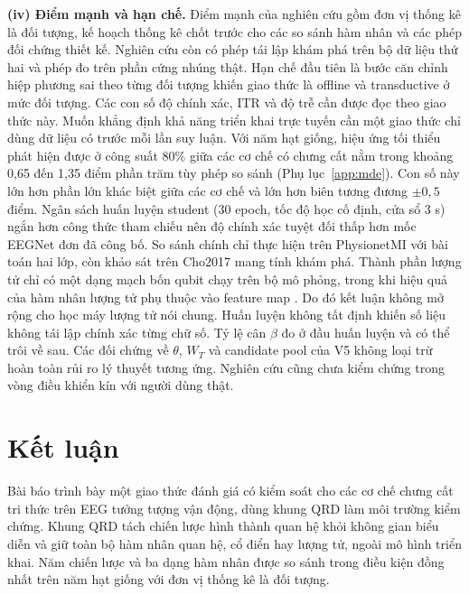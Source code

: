 \textbf{(iv) Điểm mạnh và hạn chế.} Điểm mạnh của nghiên cứu gồm đơn vị thống kê là đối tượng, kế hoạch thống kê
chốt trước cho các so sánh hàm nhân và các phép đối chứng thiết kế. Nghiên cứu
còn có phép tái lập khám phá trên bộ dữ liệu thứ hai và phép đo trên phần cứng
nhúng thật. Hạn chế đầu tiên là bước căn chỉnh
hiệp phương sai theo từng đối tượng khiến giao thức là offline và
transductive ở mức đối tượng. Các con số độ chính xác, ITR và độ trễ cần
được đọc theo giao thức này. Muốn khẳng định khả năng triển khai trực tuyến
cần một giao thức chỉ dùng dữ liệu có trước mỗi lần suy luận. Với năm hạt giống, hiệu ứng tối thiểu phát hiện được ở công suất 80\% giữa
các cơ chế có chưng cất nằm trong khoảng 0,65 đến 1,35 điểm phần trăm tùy
phép so sánh
(Phụ lục~\ref{app:mde}). Con số này lớn hơn phần lớn khác biệt giữa các cơ
chế và lớn hơn biên tương đương $\pm 0{,}5$ điểm. Ngân sách huấn luyện
student (30 epoch, tốc độ học cố định, cửa sổ 3 s) ngắn hơn công thức tham
chiếu nên độ chính xác tuyệt đối thấp hơn mốc EEGNet đơn đã công bố. So sánh chính chỉ thực hiện
trên PhysionetMI với bài toán hai lớp, còn khảo sát trên Cho2017 mang tính
khám phá. Thành phần lượng tử chỉ có một dạng mạch bốn qubit chạy trên bộ
mô phỏng, trong khi hiệu quả của hàm nhân lượng tử phụ thuộc vào feature map
\cite{jha2026comparative}. Do đó kết luận không mở rộng cho học máy lượng tử
nói chung. Huấn
luyện không tất định khiến số liệu không tái lập chính xác từng chữ số. Tỷ
lệ cân $\beta$ đo ở đầu huấn luyện và có thể trôi về sau. Các đối chứng về
$\theta$, $W_T$ và candidate pool của V5 không loại trừ hoàn toàn rủi ro lý
thuyết tương ứng. Nghiên cứu cũng chưa kiểm chứng trong vòng điều khiển kín
với người dùng thật.

\section{Kết luận}
\label{sec:ketluan}

Bài báo trình bày một giao thức đánh giá có kiểm soát cho các cơ chế chưng
cất tri thức trên EEG tưởng tượng vận động, dùng khung QRD làm môi trường
kiểm chứng. Khung QRD tách chiến lược hình thành quan hệ khỏi không gian
biểu diễn và giữ toàn bộ hàm nhân quan hệ, cổ điển hay lượng tử, ngoài mô
hình triển khai. Năm chiến lược và ba dạng hàm nhân được so sánh trong điều
kiện đồng nhất trên năm hạt giống với đơn vị thống kê là đối tượng.

